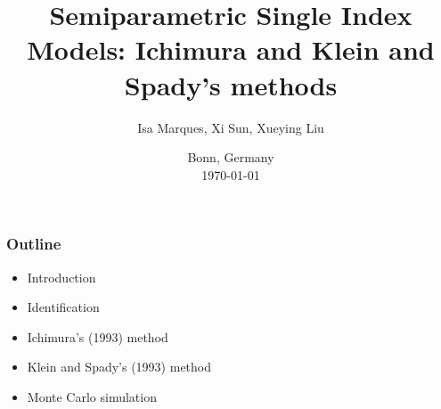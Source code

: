\documentclass{beamer}
\title[Ichimura's and Klein and Spady's methods]{Semiparametric Single Index Models: Ichimura and Klein and Spady's methods} %
\begin{document}
\author{Isa Marques, Xi Sun, Xueying Liu} %
{
}

\date{
{\small Bonn, Germany}\\
{\small \today}
}

\begin{frame}
\titlepage %
\end{frame}





\begin{frame}[t]
    \frametitle{Outline}
    
    \begin{itemize}
        \item Introduction
        \item Identification
        \item Ichimura's (1993) \cite{[6]} method
        \item Klein and Spady's (1993) \cite{[12]} method
        \item Monte Carlo simulation
    \end{itemize}
    \note{~}
\end{frame}
\end{document}
